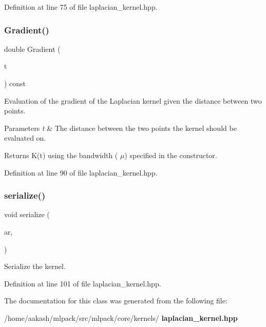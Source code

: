 Definition at line 75 of file laplacian\+\_\+kernel.\+hpp.

\mbox{\label{classmlpack_1_1kernel_1_1LaplacianKernel_a6abdb9c6ceb3252af988ab5fb5f13764}} 
\subsubsection{Gradient()}
{\footnotesize\ttfamily double Gradient (\begin{DoxyParamCaption}\item[{const double}]{t }\end{DoxyParamCaption}) const\hspace{0.3cm}{\ttfamily [inline]}}



Evaluation of the gradient of the Laplacian kernel given the distance between two points. 


\begin{DoxyParams}{Parameters}
{\em t} & The distance between the two points the kernel should be evaluated on. \\
\hline
\end{DoxyParams}
\begin{DoxyReturn}{Returns}
K(t) using the bandwidth ( $\mu$) specified in the constructor. 
\end{DoxyReturn}


Definition at line 90 of file laplacian\+\_\+kernel.\+hpp.

\mbox{\label{classmlpack_1_1kernel_1_1LaplacianKernel_a65cba07328997659bec80b9879b15a51}} 
\subsubsection{serialize()}
{\footnotesize\ttfamily void serialize (\begin{DoxyParamCaption}\item[{Archive \&}]{ar,  }\item[{const uint32\+\_\+t}]{ }\end{DoxyParamCaption})\hspace{0.3cm}{\ttfamily [inline]}}



Serialize the kernel. 



Definition at line 101 of file laplacian\+\_\+kernel.\+hpp.



The documentation for this class was generated from the following file\+:\begin{DoxyCompactItemize}
\item 
/home/aakash/mlpack/src/mlpack/core/kernels/\textbf{ laplacian\+\_\+kernel.\+hpp}\end{DoxyCompactItemize}
